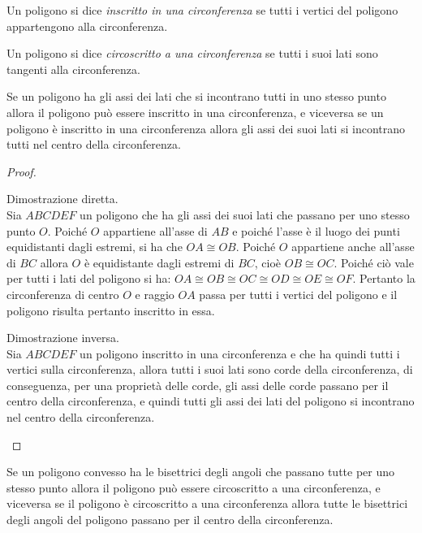 \begin{definizione}
Un poligono si dice \emph{inscritto in una circonferenza} se tutti i vertici del poligono appartengono alla circonferenza.
\end{definizione}

\begin{definizione}
Un poligono si dice \emph{circoscritto a una circonferenza} se tutti i suoi lati sono tangenti alla circonferenza.
\end{definizione}

\begin{teorema}
Se un poligono ha gli assi dei lati che si incontrano tutti in uno stesso punto allora il poligono può essere inscritto in una circonferenza, e viceversa se un poligono è inscritto in una circonferenza allora gli assi dei suoi lati si incontrano tutti nel centro della circonferenza.
\end{teorema}

\begin{proof}~\\
\begin{enumerate*}
\item Dimostrazione diretta.\\
Sia $ABCDEF$ un poligono che ha gli assi dei suoi lati che passano per uno stesso punto $O$. Poiché $O$ appartiene all'asse di $AB$ e poiché l'asse è il luogo dei punti equidistanti dagli estremi, si ha che $OA\cong OB$. Poiché $O$ appartiene anche all'asse di $BC$ allora $O$ è equidistante dagli estremi di $BC$, cioè $OB\cong OC$. Poiché ciò vale per tutti i lati del poligono si ha: $OA\cong OB\cong OC\cong OD\cong OE\cong OF$. Pertanto la circonferenza di centro $O$ e raggio $OA$ passa per tutti i vertici del poligono e il poligono risulta pertanto inscritto in essa.
\item Dimostrazione inversa.\\
Sia $ABCDEF$ un poligono inscritto in una circonferenza e che ha quindi tutti i vertici sulla circonferenza, allora tutti i suoi lati sono corde della circonferenza, di conseguenza, per una proprietà delle corde, gli assi delle corde passano per il centro della circonferenza, e quindi tutti gli assi dei lati del poligono si incontrano nel centro della circonferenza.
\end{enumerate*}
\end{proof}

\begin{teorema}
Se un poligono convesso ha le bisettrici degli angoli che passano tutte per uno stesso punto allora il poligono può essere circoscritto a una circonferenza, e viceversa se il poligono è circoscritto a una circonferenza allora tutte le bisettrici degli angoli del poligono passano per il centro della circonferenza.
\end{teorema}

